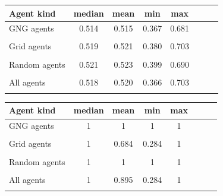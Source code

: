 \begin{center}
  \begin{tabular}{l*{6}{c}r}
  Agent kind        & median & mean & min & max \\
  \hline
  GNG agents        & 0.514                   & 0.515                   & 0.367                  & 0.681  \\
                    & \color{red}{-0.003}     & \color{red}{-0.005}     & \color{red}{-0.035}    & \color{red}{-0.024}      \\
  Grid agents       & 0.519                   & 0.521                   & 0.380                  & 0.703   \\   
                    & \color{green}{+0.002}   & \color{green}{+0.003}   & \color{green}{+0.004}  & \color{green}{+0.037} \\
  Random agents     & 0.521                   & 0.523                   & 0.399                  & 0.690   \\
                    & \color{red}{-0.001}     & \color{red}{-0.002}  	& \color{red}{-0.008}    & \color{red}{-0.007}  \\
  All agents        & 0.518                   & 0.520                   & 0.366                  & 0.703  \\
                    & \color{green}{+0.001}   & \color{green}{+0.001}   & \color{red}{-0.001}  &   \color{red}{-0.002}    \\
  \end{tabular}                                
\end{center}

\begin{center} 
  \begin{tabular}{l*{6}{c}r}
  Agent kind        & median & mean & min & max \\
  \hline
  GNG agents        & 1 & 1 & 1 & 1  \\
                    &   \\
  Grid agents       & 1                     & 0.684                 & 0.284                & 1  \\  
                    & \color{green}{+0.542}  & \color{green}{0.062}  & \color{red}{-0.045}  \\
  Random agents     & 1 & 1 & 1 & 1  \\         
                    & \\
  All agents        & 1 & 0.895                 & 0.284 & 1  \\  
                    &   & \color{green}{+0.133}  & \color{red}{-0.036} \\
  \end{tabular}                                        
\end{center}


